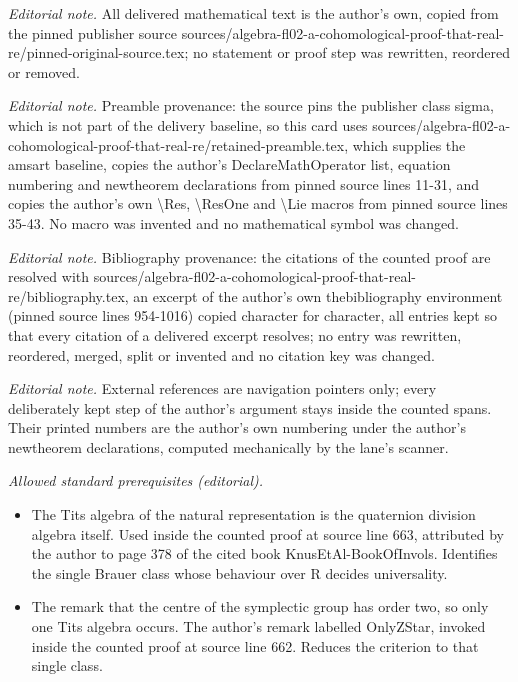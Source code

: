 \maketitle
\noindent\textit{Editorial note.} All delivered mathematical text is the author's own, copied from the pinned publisher source sources/algebra-fl02-a-cohomological-proof-that-real-re/pinned-original-source.tex; no statement or proof step was rewritten, reordered or removed.\par\medskip
\noindent\textit{Editorial note.} Preamble provenance: the source pins the publisher class sigma, which is not part of the delivery baseline, so this card uses sources/algebra-fl02-a-cohomological-proof-that-real-re/retained-preamble.tex, which supplies the amsart baseline, copies the author's DeclareMathOperator list, equation numbering and newtheorem declarations from pinned source lines 11-31, and copies the author's own \textbackslash{}Res, \textbackslash{}ResOne and \textbackslash{}Lie macros from pinned source lines 35-43. No macro was invented and no mathematical symbol was changed.\par\medskip
\noindent\textit{Editorial note.} Bibliography provenance: the citations of the counted proof are resolved with sources/algebra-fl02-a-cohomological-proof-that-real-re/bibliography.tex, an excerpt of the author's own thebibliography environment (pinned source lines 954-1016) copied character for character, all entries kept so that every citation of a delivered excerpt resolves; no entry was rewritten, reordered, merged, split or invented and no citation key was changed.\par\medskip
\noindent\textit{Editorial note.} External references are navigation pointers only; every deliberately kept step of the author's argument stays inside the counted spans. Their printed numbers are the author's own numbering under the author's newtheorem declarations, computed mechanically by the lane's scanner.\par\medskip
\noindent\textit{Allowed standard prerequisites (editorial).}\begin{itemize}
\item The Tits algebra of the natural representation is the quaternion division algebra itself. Used inside the counted proof at source line 663, attributed by the author to page 378 of the cited book KnusEtAl-BookOfInvols. Identifies the single Brauer class whose behaviour over R decides universality.
\item The remark that the centre of the symplectic group has order two, so only one Tits algebra occurs. The author's remark labelled OnlyZStar, invoked inside the counted proof at source line 662. Reduces the criterion to that single class.
\end{itemize}\medskip
